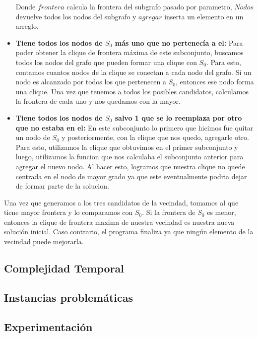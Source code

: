 \begin{itemize}
Donde $frontera$ calcula la frontera del subgrafo pasado por parametro, $Nodos$ devuelve todos los nodos del subgrafo y $agregar$ inserta un elemento en un arreglo.

\item \textbf{Tiene todos los nodos de $S_{0}$ más uno que no pertenecía a el:} \newline
Para poder obtener la clique de frontera máxima de este subconjunto, buscamos todos los nodos del grafo que pueden formar una clique con $S_{0}$. Para esto, contamos cuantos nodos de la clique se conectan a cada nodo del grafo. Si un nodo es alcanzado por todos los que pertenecen a $S_{0}$, entonces ese nodo forma una clique. Una vez que tenemos a todos los posibles candidatos, calculamos la frontera de cada uno y nos quedamos con la mayor.
\item \textbf{Tiene todos los nodos de $S_{0}$ salvo 1 que se lo reemplaza por otro que no estaba en el:} \newline
En este subconjunto lo primero que hicimos fue quitar un nodo de $S_{0}$ y posteriormente, con la clique que nos quedo, agregarle otro. Para esto, utilizamos la clique que obtuvimos en el primer subconjunto y luego, utilizamos la funcion que nos calculaba el subconjunto anterior para agregar el nuevo nodo. Al hacer esto, logramos que nuestra clique no quede centrada en el nodo de mayor grado ya que este eventualmente podria dejar de formar parte de la solucion. \newline
\end{itemize}

Una vez que generamos a los tres candidatos de la vecindad, tomamos al que tiene mayor frontera y lo comparamos con $S_{0}$. Si la frontera de $S_{0}$ es menor, entonces la clique de frontera maxima de nuestra vecindad es nuestra nueva solución inicial. Caso contrario, el programa finaliza ya que ningún elemento de la vecindad puede mejorarla.

\subsection{Complejidad Temporal}
\subsection{Instancias problemáticas}
\subsection{Experimentación}

